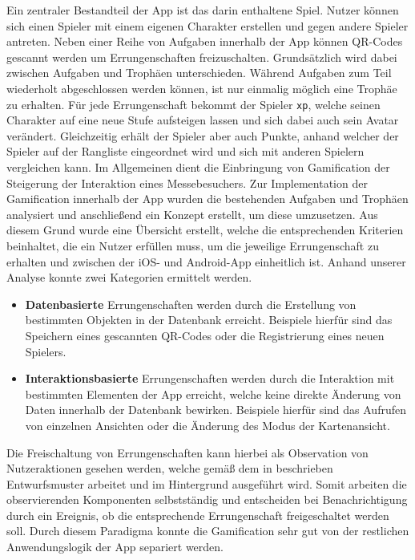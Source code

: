 Ein zentraler Bestandteil der App ist das darin enthaltene Spiel. Nutzer können sich einen Spieler mit einem eigenen Charakter erstellen und gegen andere Spieler antreten. Neben einer Reihe von Aufgaben innerhalb der App können QR-Codes gescannt werden um Errungenschaften freizuschalten. Grundsätzlich wird dabei zwischen Aufgaben und Trophäen unterschieden. Während Aufgaben zum Teil wiederholt abgeschlossen werden können, ist nur einmalig möglich eine Trophäe zu erhalten. Für jede Errungenschaft bekommt der Spieler \texttt{xp}, welche seinen Charakter auf eine neue Stufe aufsteigen lassen und sich dabei auch sein Avatar verändert. Gleichzeitig erhält der Spieler aber auch Punkte, anhand welcher der Spieler auf der Rangliste eingeordnet wird und sich mit anderen Spielern vergleichen kann. Im Allgemeinen dient die Einbringung von Gamification der Steigerung der Interaktion eines Messebesuchers. Zur Implementation der Gamification innerhalb der App wurden die bestehenden Aufgaben und Trophäen analysiert und anschließend ein Konzept erstellt, um diese umzusetzen. Aus diesem Grund wurde eine Übersicht erstellt, welche die entsprechenden Kriterien beinhaltet, die ein Nutzer erfüllen muss, um die jeweilige Errungenschaft zu erhalten und zwischen der iOS- und Android-App einheitlich ist. Anhand unserer Analyse konnte zwei Kategorien ermittelt werden.

\begin{itemize}
    \item \textbf{Datenbasierte} Errungenschaften werden durch die Erstellung von bestimmten Objekten in der Datenbank erreicht. Beispiele hierfür sind das Speichern eines gescannten QR-Codes oder die Registrierung eines neuen Spielers.
    \item \textbf{Interaktionsbasierte} Errungenschaften werden durch die Interaktion mit bestimmten Elementen der App erreicht, welche keine direkte Änderung von Daten innerhalb der Datenbank bewirken. Beispiele hierfür sind das Aufrufen von einzelnen Ansichten oder die Änderung des Modus der Kartenansicht.
\end{itemize}

Die Freischaltung von Errungenschaften kann hierbei als Observation von Nutzeraktionen gesehen werden, welche gemäß dem in  beschrieben Entwurfsmuster arbeitet und im Hintergrund ausgeführt wird. Somit arbeiten die observierenden Komponenten selbstständig und entscheiden bei Benachrichtigung durch ein Ereignis, ob die entsprechende Errungenschaft freigeschaltet werden soll. Durch diesem Paradigma konnte die Gamification sehr gut von der restlichen Anwendungslogik der App separiert werden. 

